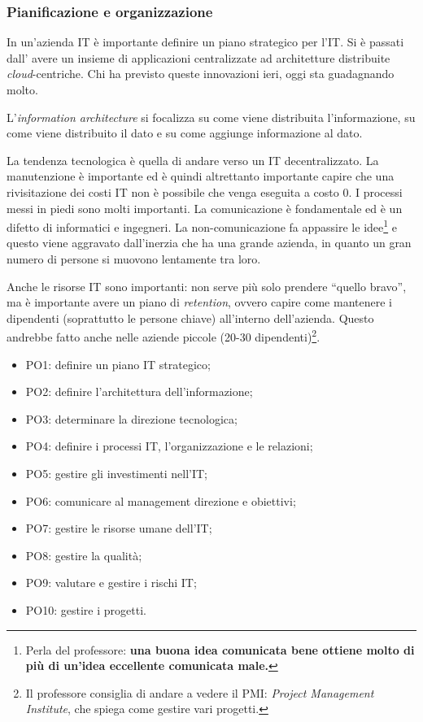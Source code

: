 \subsubsection{Pianificazione e organizzazione}

In un'azienda IT è importante definire un piano strategico per l'IT. Si è passati dall'
avere un insieme di applicazioni centralizzate ad architetture distribuite 
\textit{cloud}-centriche. Chi ha previsto queste innovazioni ieri, oggi sta 
guadagnando molto.

L'\textit{information architecture} si focalizza su come viene distribuita 
l'informazione, su come viene distribuito il dato e su come aggiunge 
informazione al dato.

La tendenza tecnologica è quella di andare verso un IT decentralizzato. La 
manutenzione è importante ed è quindi altrettanto importante capire che una rivisitazione 
dei costi IT non è possibile che venga eseguita a costo 0. I processi messi in piedi sono 
molti importanti. La comunicazione è fondamentale ed è un difetto di 
informatici e ingegneri. La non-comunicazione fa appassire le 
idee\footnote{Perla del professore: \textbf{una buona idea comunicata bene 
ottiene molto di più di un'idea eccellente comunicata male.}} e questo viene 
aggravato dall'inerzia che ha una grande azienda, in quanto un gran numero di 
persone si muovono lentamente tra loro.

Anche le risorse IT sono importanti: non serve più solo prendere ``quello 
bravo'', ma è importante avere un piano di \textit{retention}, ovvero capire 
come mantenere i dipendenti (soprattutto le persone chiave) all'interno 
dell'azienda. Questo andrebbe fatto anche nelle aziende piccole (20-30 
dipendenti)\footnote{Il professore consiglia di andare a vedere il PMI: 
\textit{Project Management Institute}, che spiega come gestire vari progetti.}.

\begin{itemize}
\item PO1: definire un piano IT strategico;
\item PO2: definire l'architettura dell'informazione;
\item PO3: determinare la direzione tecnologica;
\item PO4: definire i processi IT, l'organizzazione e le relazioni;
\item PO5: gestire gli investimenti nell'IT;
\item PO6: comunicare al management direzione e obiettivi;
\item PO7: gestire le risorse umane dell'IT;
\item PO8: gestire la qualità;
\item PO9: valutare e gestire i rischi IT; 
\item PO10: gestire i progetti.

\end{itemize}

